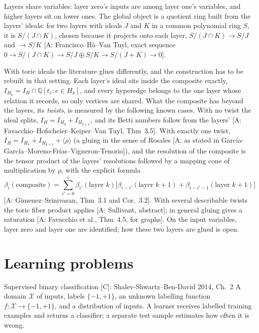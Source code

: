 \documentclass[11pt,a4paper]{article}
\newcommand{\Q}{\mathbb{Q}}
\newcommand{\gr}[1]{\textsf{[#1]}}
\begin{document}
Layers share variables: layer zero's inputs are among layer one's variables, and higher layers sit on lower ones. The global object is a quotient ring built from the layers' ideals: for two layers with ideals $J$ and $K$ in a common polynomial ring $S$, it is $S/(J\cap K)$, chosen because it projects onto each layer, $S/(J\cap K)\to S/J$ and $\to S/K$ \gr{A: Francisco--Hà--Van Tuyl, exact sequence $0\to S/(J\cap K)\to S/J\oplus S/K\to S/(J+K)\to0$}.

With toric ideals the literature glues differently, and the construction has to be rebuilt in that setting. Each layer's ideal sits inside the composite exactly, $I_{H_k}=I_H\cap\Q[t_e:e\in H_k]$, and every hyperedge belongs to the one layer whose relation it records, so only vertices are shared. What the composite has beyond the layers, its \emph{twists}, is measured by the following known cases. With no twist the ideal splits, $I_H=I_{H_k}+I_{H_{k+1}}$, and its Betti numbers follow from the layers' \gr{A: Favacchio--Hofscheier--Keiper--Van Tuyl, Thm~3.5}. With exactly one twist, $I_H=I_{H_k}+I_{H_{k+1}}+\langle\rho\rangle$ (a gluing in the sense of Rosales \gr{A: as stated in García-García--Moreno-Frías--Vigneron-Tenorio}), and the resolution of the composite is the tensor product of the layers' resolutions followed by a mapping cone of multiplication by $\rho$, with the explicit formula
\[\beta_i(\text{composite})=\sum_{i'=0}^{i}\beta_{i'}(\text{layer }k)\big[\beta_{i-i'}(\text{layer }k{+}1)+\beta_{i-i'-1}(\text{layer }k{+}1)\big]\]
\gr{A: Gimenez--Srinivasan, Thm~3.1 and Cor.~3.2}. With several describable twists the toric fiber product applies \gr{A: Sullivant, abstract}; in general gluing gives a saturation \gr{A: Favacchio et al., Thm~4.5, for graphs}. On the input variables, layer zero and layer one are identified; how these two layers are glued is open.

\section{Learning problems}\label{sec:learning}

\begin{defn}{Supervised binary classification \gr{C}: Shalev-Shwartz--Ben-David 2014, Ch.~2}
A domain $\mathcal{X}$ of inputs, labels $\{-1,+1\}$, an unknown labelling function $f:\mathcal{X}\to\{-1,+1\}$, and a distribution of inputs. A learner receives labelled training examples and returns a classifier; a separate test sample estimates how often it is wrong.
\end{defn}
\end{document}
